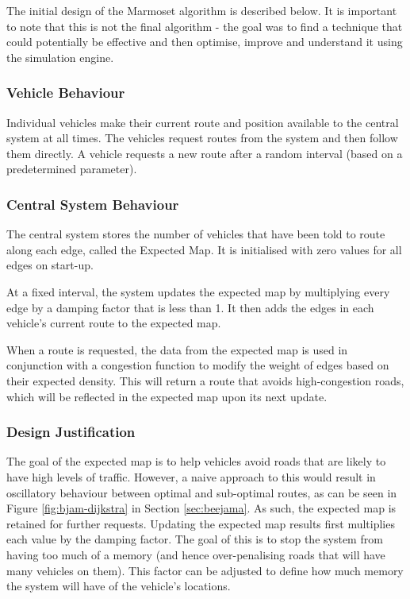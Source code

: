 \documentclass[ %
                    author={Alexander Hill},
                supervisor={Dr. Benjamin Sach},
                    degree={MEng},
                     title={MARMOSET},
                  subtitle={Multi-Agent Route Management using Online Simulation for Efficient Transportation},
                      type={research},
                      year={2016} ]{dissertation}
\begin{document}
The initial design of the Marmoset algorithm is described below. It is
important to note that this is not the final algorithm - the goal was to find a
technique that could potentially be effective and then optimise, improve and
understand it using the simulation engine.

\subsubsection{Vehicle Behaviour}

Individual vehicles make their current route and position available to
the central system at all times. The vehicles request routes from the system and
then follow them directly. A vehicle requests a new route after a random
interval (based on a predetermined parameter).

\subsubsection{Central System Behaviour}

The central system stores the number of vehicles that have been told to route
along each edge, called the Expected Map. It is initialised with zero values for
all edges on start-up.

At a fixed interval, the system updates the expected map by multiplying every
edge by a damping factor that is less than 1. It then adds the edges in each
vehicle's current route to the expected map.

When a route is requested, the data from the expected map is used in conjunction
with a congestion function to modify the weight of edges based on their expected
density. This will return a route that avoids high-congestion roads, which will
be reflected in the expected map upon its next update.

\subsubsection{Design Justification}

The goal of the expected map is to help vehicles avoid roads that are likely to
have high levels of traffic. However, a naive approach to this would result in
oscillatory behaviour between optimal and sub-optimal routes, as can be seen in
Figure \ref{fig:bjam-dijkstra} in Section \ref{sec:beejama}. As such, the expected map
is retained for further requests. Updating the expected map results first
multiplies each value by the damping factor. The goal of this is to stop the
system from having too much of a memory (and hence over-penalising roads that
will have many vehicles on them). This factor can be adjusted to define how much memory
the system will have of the vehicle's locations.
\end{document}
